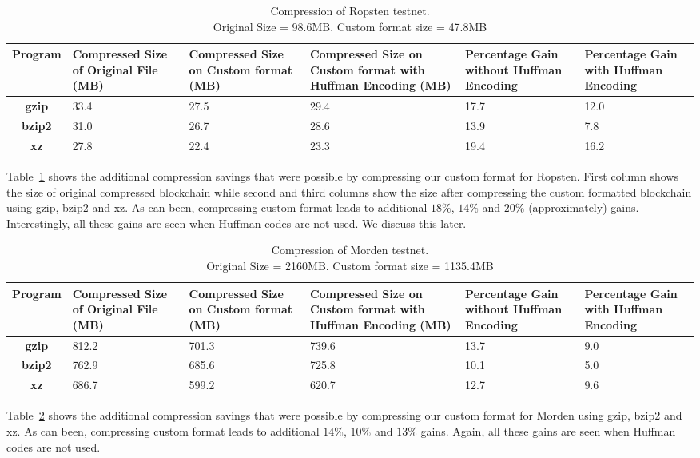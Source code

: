 \begin{table}[H]
\centering
\captionsetup{justification=centering}
\begin{tabular}{ >{\bfseries}c| p{2cm} | p{2cm} |p{2cm} | p{1.5cm} | p{1.5cm} }
	Program & {Compressed Size of Original File (MB)} & {Compressed Size on Custom format (MB)} & {Compressed Size on Custom format with Huffman Encoding (MB)}& Percentage Gain without Huffman Encoding & Percentage Gain with Huffman Encoding\\
  \hline
  gzip  & 33.4 & 27.5 & 29.4 & 17.7 & 12.0 \\
  bzip2 & 31.0 & 26.7 & 28.6 & 13.9 & 7.8  \\
  xz   & 27.8 & 22.4 &  23.3 & 19.4 & 16.2 \\
\end{tabular}
\caption{Compression of Ropsten testnet. \\ Original Size = 98.6MB. Custom format size = 47.8MB}
\label{tab:compropsten}
\end{table}
Table~\ref{tab:compropsten} 
shows the additional compression savings that were possible by compressing 
our custom format for Ropsten.
First column shows the size of original compressed blockchain 
while
second and third columns show the size after compressing the custom formatted blockchain using gzip, bzip2 and xz. 
As can been, compressing custom format leads to additional $18\%$, $14\%$ and $20\%$ (approximately) gains. Interestingly, all these gains are seen when
Huffman codes are not used. We discuss this later.



\begin{table}[H]
\centering
\captionsetup{justification=centering}
\begin{tabular}{ >{\bfseries}c| p{2cm} | p{2cm} | p{2cm} | p{1.5cm} | p{1.5cm} }
	Program & {Compressed Size of Original File (MB)} & {Compressed Size on Custom format (MB)} & {Compressed Size on Custom format with Huffman Encoding (MB)} & Percentage Gain without Huffman Encoding & Percentage Gain with Huffman Encoding \\
  \hline
  gzip  & 812.2 & 701.3 & 739.6 & 13.7 & 9.0 \\
  bzip2 & 762.9 & 685.6 & 725.8 & 10.1 & 5.0 \\
  xz   & 686.7 & 599.2 &  620.7 & 12.7 & 9.6 \\
\end{tabular}
\caption{Compression of Morden testnet. \\Original Size = 2160MB. Custom format size = 1135.4MB}
\label{tab:compmorden}
\end{table}
Table~\ref{tab:compmorden} 
shows the additional compression savings that were possible by compressing 
our custom format for Morden using gzip, bzip2 and xz.
As can been, compressing custom format leads to additional $14\%$, $10\%$ and $13\%$  gains. Again, all these gains are seen when Huffman codes are not used. 

